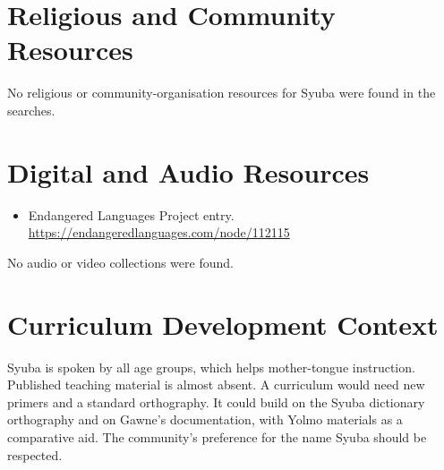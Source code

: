 \documentclass[12pt]{article}
\begin{document}
\section{Religious and Community Resources}
No religious or community-organisation resources for Syuba were found in the searches.

\section{Digital and Audio Resources}
\begin{itemize}
\item Endangered Languages Project entry. \url{https://endangeredlanguages.com/node/112115}
\end{itemize}
No audio or video collections were found.

\section{Curriculum Development Context}
Syuba is spoken by all age groups, which helps mother-tongue instruction. Published teaching material is almost absent. A curriculum would need new primers and a standard orthography. It could build on the Syuba dictionary orthography and on Gawne's documentation, with Yolmo materials as a comparative aid. The community's preference for the name Syuba should be respected.
\end{document}
